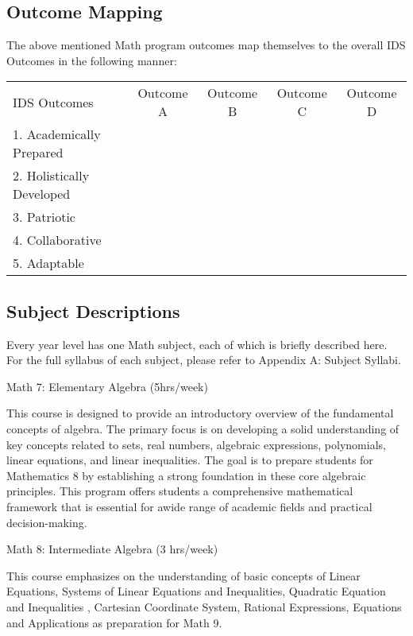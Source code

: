 \subsection{Outcome Mapping}
The above mentioned Math program outcomes map themselves to the overall IDS Outcomes in the following manner:
\begin{center}
	\begin{tabular}{ l | c | c | c | c }
		IDS Outcomes				& Outcome A 	& Outcome B   &  Outcome C & Outcome D 	\\
		1. Academically Prepared	& \checkmark	& 		 	  &  		   & \checkmark\\
		2. Holistically Developed	& 				&			  &	 			& \\
		3. Patriotic 				& 				&			  &				&	\\
		4. Collaborative			& 				&			  &	\checkmark	& \\
		5. Adaptable				&				& \checkmark  &				&	\\
	\end{tabular}
\end{center}



\subsection{Subject Descriptions}
Every year level has one Math subject, each of which is briefly described here. For the full syllabus of each subject, please refer to Appendix A: Subject Syllabi.

\begin{subject}
	Math 7: Elementary Algebra
	\hfill
	(5hrs/week)
\end{subject}
This course is designed to provide an introductory overview of the fundamental concepts of algebra. The primary focus is on developing a solid understanding of key concepts related to sets, real numbers, algebraic expressions, polynomials, linear equations, and linear inequalities. The goal is to prepare students for Mathematics 8 by establishing a strong foundation in these core algebraic principles. This program offers students a comprehensive mathematical framework that is essential for awide range of academic fields and practical decision-making.

\begin{subject} Math 8: Intermediate Algebra
	\hfill
	(3 hrs/week)
\end{subject}
This course emphasizes on the understanding of basic concepts of Linear Equations, Systems of Linear Equations and Inequalities, Quadratic Equation and Inequalities , Cartesian Coordinate System, Rational Expressions, Equations and Applications as preparation for Math 9.

